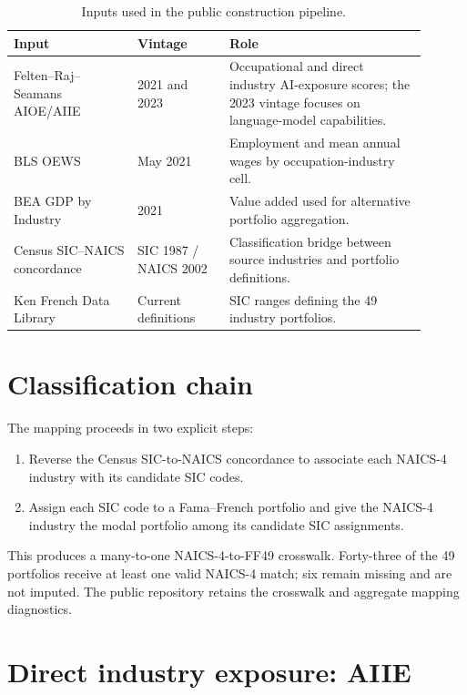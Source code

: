 \documentclass[11pt,a4paper]{article}
\begin{document}
\begin{table}[h]
\centering
\small
\begin{tabular}{p{0.27\linewidth}p{0.20\linewidth}p{0.43\linewidth}}
\toprule
Input & Vintage & Role \\
\midrule
Felten--Raj--Seamans AIOE/AIIE & 2021 and 2023 & Occupational and direct industry AI-exposure scores; the 2023 vintage focuses on language-model capabilities. \\
BLS OEWS & May 2021 & Employment and mean annual wages by occupation-industry cell. \\
BEA GDP by Industry & 2021 & Value added used for alternative portfolio aggregation. \\
Census SIC--NAICS concordance & SIC 1987 / NAICS 2002 & Classification bridge between source industries and portfolio definitions. \\
Ken French Data Library & Current definitions & SIC ranges defining the 49 industry portfolios. \\
\bottomrule
\end{tabular}
\caption{Inputs used in the public construction pipeline.}
\end{table}

\section{Classification chain}

The mapping proceeds in two explicit steps:

\begin{enumerate}
  \item Reverse the Census SIC-to-NAICS concordance to associate each NAICS-4 industry with its candidate SIC codes.
  \item Assign each SIC code to a Fama--French portfolio and give the NAICS-4 industry the modal portfolio among its candidate SIC assignments.
\end{enumerate}

This produces a many-to-one NAICS-4-to-FF49 crosswalk. Forty-three of the 49 portfolios receive at least one valid NAICS-4 match; six remain missing and are not imputed. The public repository retains the crosswalk and aggregate mapping diagnostics.

\section{Direct industry exposure: AIIE}
\end{document}
